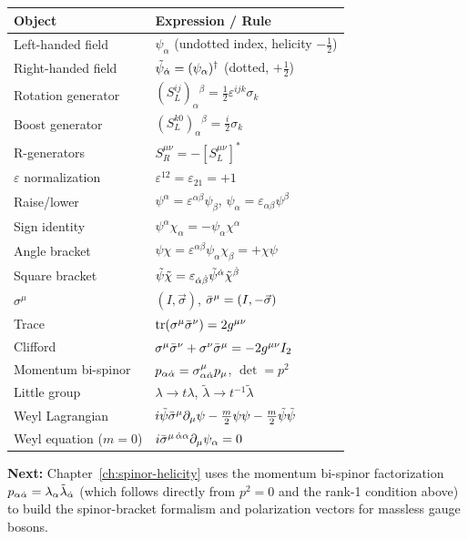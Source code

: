 \begin{center}
\renewcommand{\arraystretch}{1.4}
\begin{tabular}{@{}p{5cm}p{8.5cm}@{}}
  \toprule
  Object & Expression / Rule \\
  \midrule
  Left-handed field & $\psi_\alpha$ \quad (undotted index, helicity $-\tfrac{1}{2}$) \\
  Right-handed field & $\tilde\psi_{\dot{\alpha}} = (\psi_\alpha)^\dagger$ \quad (dotted, $+\tfrac{1}{2}$) \\
  Rotation generator & $(S^{ij}_L)_\alpha{}^\beta = \tfrac{1}{2}\varepsilon^{ijk}\sigma_k$ \\
  Boost generator & $(S^{k0}_L)_\alpha{}^\beta = \tfrac{i}{2}\sigma_k$ \\
  R-generators & $S^{\mu\nu}_R = -[S^{\mu\nu}_L]^*$ \\
  $\varepsilon$ normalization & $\varepsilon^{12}=\varepsilon_{21}=+1$ \\
  Raise/lower & $\psi^\alpha = \varepsilon^{\alpha\beta}\psi_\beta$, \quad $\psi_\alpha = \varepsilon_{\alpha\beta}\psi^\beta$ \\
  Sign identity & $\psi^\alpha\chi_\alpha = -\psi_\alpha\chi^\alpha$ \\
  Angle bracket & $\psi\chi = \varepsilon^{\alpha\beta}\psi_\alpha\chi_\beta = +\chi\psi$ \\
  Square bracket & $\tilde\psi\tilde\chi = \varepsilon_{\dot{\alpha}\dot{\beta}}\tilde\psi^{\dot{\alpha}}\tilde\chi^{\dot{\beta}}$ \\
  $\sigma^\mu$ & $(I,\vec\sigma)$, \quad $\bar{\sigma}^\mu = (I,-\vec\sigma)$ \\
  Trace & $\mathrm{tr}(\sigma^\mu\bar{\sigma}^\nu) = 2g^{\mu\nu}$ \\
  Clifford & $\sigma^\mu\bar{\sigma}^\nu + \sigma^\nu\bar{\sigma}^\mu = -2g^{\mu\nu}I_2$ \\
  Momentum bi-spinor & $p_{\alpha\dot{\alpha}} = \sigma^\mu_{\alpha\dot{\alpha}}p_\mu$, \quad $\det = p^2$ \\
  Little group & $\lambda\to t\lambda$, $\tilde\lambda\to t^{-1}\tilde\lambda$ \\
  Weyl Lagrangian & $i\tilde\psi\bar{\sigma}^\mu\partial_\mu\psi - \tfrac{m}{2}\psi\psi - \tfrac{m}{2}\tilde\psi\tilde\psi$ \\
  Weyl equation ($m=0$) & $i\bar{\sigma}^{\mu\,\dot{\alpha}\alpha}\partial_\mu\psi_\alpha = 0$ \\
  \bottomrule
\end{tabular}
\end{center}

\bigskip
\noindent\textbf{Next:} Chapter~\ref{ch:spinor-helicity} uses the momentum
bi-spinor factorization $p_{\alpha\dot{\alpha}}=\lambda_\alpha\tilde\lambda_{\dot{\alpha}}$
(which follows directly from $p^2=0$ and the rank-1 condition above) to
build the spinor-bracket formalism and polarization vectors for massless
gauge bosons.
